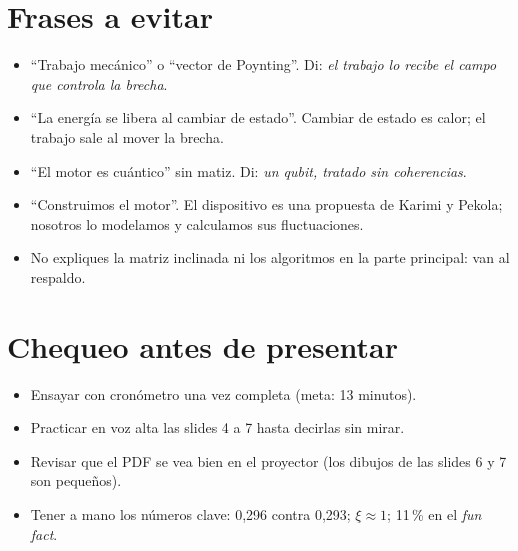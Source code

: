 \documentclass[11pt,a4paper]{article}
\begin{document}
\section*{Frases a evitar}
\begin{itemize}
\item ``Trabajo mecánico'' o ``vector de Poynting''. Di: \emph{el trabajo lo recibe el campo que controla la brecha}.
\item ``La energía se libera al cambiar de estado''. Cambiar de estado es calor; el trabajo sale al mover la brecha.
\item ``El motor es cuántico'' sin matiz. Di: \emph{un qubit, tratado sin coherencias}.
\item ``Construimos el motor''. El dispositivo es una propuesta de Karimi y Pekola; nosotros lo modelamos y calculamos sus fluctuaciones.
\item No expliques la matriz inclinada ni los algoritmos en la parte principal: van al respaldo.
\end{itemize}

\section*{Chequeo antes de presentar}
\begin{itemize}[label=$\square$]
\item Ensayar con cronómetro una vez completa (meta: 13 minutos).
\item Practicar en voz alta las slides 4 a 7 hasta decirlas sin mirar.
\item Revisar que el PDF se vea bien en el proyector (los dibujos de las slides 6 y 7 son pequeños).
\item Tener a mano los números clave: 0,296 contra 0,293; $\xi \approx 1$; 11\,\% en el \emph{fun fact}.
\end{itemize}
\end{document}
